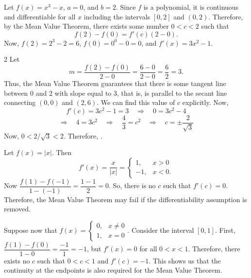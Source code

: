 \documentclass{book}
\begin{document}
\begin{Exam} Let $f(x) = x^3-x$, $a = 0$, and $b=2$. Since $f$ is a polynomial, it is continuous and differentiable for all $x$ including the intervals $[0,2]$ and $(0,2)$. Therefore, by the Mean Value Theorem, there exists some number $0 < c< 2$ such that \[f(2) - f(0) = f'(c)(2-0).\] Now, $f(2) = 2^3-2 = 6$, $f(0) = 0^0 - 0 = 0$, and $f'(x) = 3x^2-1$. 
\begin{multicols}{2}
Let \[m = \dfrac{f(2)-f(0)}{2-0} = \dfrac{6-0}{2-0} = \dfrac{6}{2} = 3.\] 
Thus, the Mean Value Theorem guarantees that there is some tangent line between 0 and 2 with slope equal to 3, that is, is parallel to the secant line connecting $(0,0)$ and $(2,6)$. We can find this value of $c$ explicitly. Now, 
\[f'(c) = 3c^2-1 = 3 \quad\Rightarrow\quad  0 = 3c^2-4\]
\[ \Rightarrow\quad 4 = 3c^2  \quad\Rightarrow\quad \dfrac{4}{3} = c^2  \quad\Rightarrow\quad  c = \pm\dfrac{2}{\sqrt{3}}\]
 Now, $0 < 2/\sqrt{3} < 2$. Therefore, . 

\begin{center}
\end{center}
\end{multicols}
\end{Exam}\vs

\begin{Exam} Let $f(x) = |x|$. Then \[f'(x) = \dfrac{x}{|x|} = \left\{\begin{array}{ll} 1, & x>0\\ -1, & x<0.\end{array}\right.\] Now $\dfrac{f(1) -f(-1)}{1-(-1)} = \dfrac{1-1}{2} = 0.$ So, there is no $c$ such that $f'(c) = 0$. Therefore, the Mean Value Theorem may fail if the differentiability assumption is removed.
\end{Exam}\vs


\begin{Exam} Suppose now that $f(x) =\left\{ \begin{array}{ll} 0, & x \neq 0\\ 1, & x=0\end{array}\right.$. Consider the interval $[0,1]$. First, $\dfrac{f(1)-f(0)}{1-0} = \dfrac{-1}{1} = -1$, but $f'(x) = 0$ for all $0 < x < 1$. Therefore, there exists no $c$ such that $0 < c < 1$ and $f'(c) = -1$. This shows us that the continuity at the endpoints is also required for the Mean Value Theorem. 
\end{Exam}\vs
\end{document}
